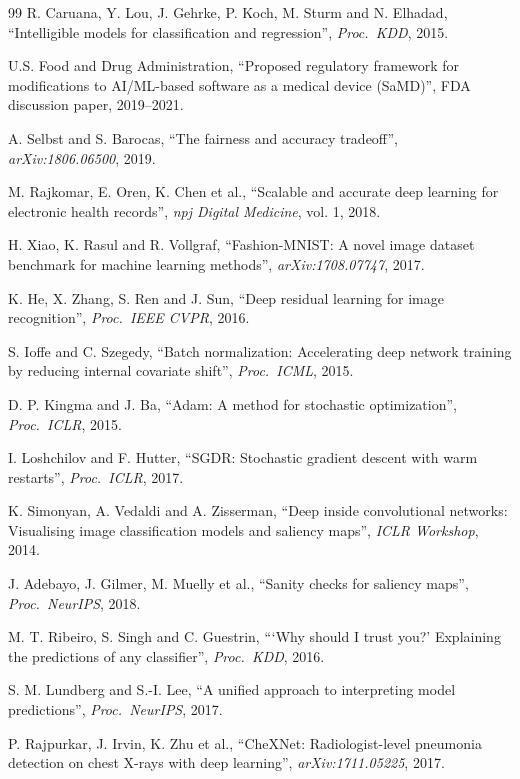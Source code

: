 \documentclass[11pt,a4paper]{article}
\begin{document}
\begin{thebibliography}{99}
R. Caruana, Y. Lou, J. Gehrke, P. Koch, M. Sturm and N. Elhadad, ``Intelligible models for classification and regression'', \emph{Proc.\ KDD}, 2015.

U.S. Food and Drug Administration, ``Proposed regulatory framework for modifications to AI/ML-based software as a medical device (SaMD)'', FDA discussion paper, 2019--2021.

A. Selbst and S. Barocas, ``The fairness and accuracy tradeoff'', \emph{arXiv:1806.06500}, 2019.

M. Rajkomar, E. Oren, K. Chen et al., ``Scalable and accurate deep learning for electronic health records'', \emph{npj Digital Medicine}, vol. 1, 2018.

H. Xiao, K. Rasul and R. Vollgraf, ``Fashion-MNIST: A novel image dataset benchmark for machine learning methods'', \emph{arXiv:1708.07747}, 2017.

K. He, X. Zhang, S. Ren and J. Sun, ``Deep residual learning for image recognition'', \emph{Proc.\ IEEE CVPR}, 2016.

S. Ioffe and C. Szegedy, ``Batch normalization: Accelerating deep network training by reducing internal covariate shift'', \emph{Proc.\ ICML}, 2015.

D. P. Kingma and J. Ba, ``Adam: A method for stochastic optimization'', \emph{Proc.\ ICLR}, 2015.

I. Loshchilov and F. Hutter, ``SGDR: Stochastic gradient descent with warm restarts'', \emph{Proc.\ ICLR}, 2017.

K. Simonyan, A. Vedaldi and A. Zisserman, ``Deep inside convolutional networks: Visualising image classification models and saliency maps'', \emph{ICLR Workshop}, 2014.

J. Adebayo, J. Gilmer, M. Muelly et al., ``Sanity checks for saliency maps'', \emph{Proc.\ NeurIPS}, 2018.

M. T. Ribeiro, S. Singh and C. Guestrin, ```Why should I trust you?' Explaining the predictions of any classifier'', \emph{Proc.\ KDD}, 2016.

S. M. Lundberg and S.-I. Lee, ``A unified approach to interpreting model predictions'', \emph{Proc.\ NeurIPS}, 2017.

P. Rajpurkar, J. Irvin, K. Zhu et al., ``CheXNet: Radiologist-level pneumonia detection on chest X-rays with deep learning'', \emph{arXiv:1711.05225}, 2017.


\end{thebibliography}
\end{document}
